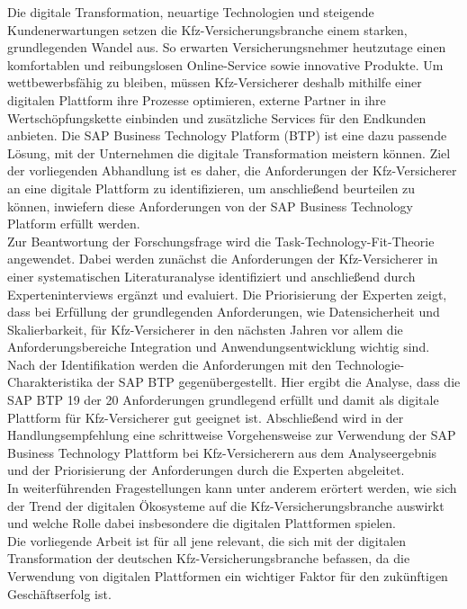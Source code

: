 Die digitale Transformation, neuartige Technologien und steigende Kundenerwartungen setzen die Kfz-Versicherungsbranche einem starken, grundlegenden Wandel aus. So erwarten Versicherungsnehmer heutzutage einen komfortablen und reibungslosen Online-Service sowie innovative Produkte. Um wettbewerbsfähig zu bleiben, müssen Kfz-Versicherer deshalb mithilfe einer digitalen Plattform ihre Prozesse optimieren, externe Partner in ihre Wertschöpfungskette einbinden und zusätzliche Services für den Endkunden anbieten. Die SAP Business Technology Platform (BTP) ist eine dazu passende Lösung, mit der Unternehmen die digitale Transformation meistern können. Ziel der vorliegenden Abhandlung ist es daher, die Anforderungen der Kfz-Versicherer an eine digitale Plattform zu identifizieren, um anschließend beurteilen zu können, inwiefern diese Anforderungen von der SAP Business Technology Platform erfüllt werden.\\
Zur Beantwortung der Forschungsfrage wird die Task-Technology-Fit-Theorie angewendet. Dabei werden zunächst die Anforderungen der Kfz-Versicherer in einer systematischen Literaturanalyse identifiziert und anschließend durch Experteninterviews ergänzt und evaluiert. Die Priorisierung der Experten zeigt, dass bei Erfüllung der grundlegenden Anforderungen, wie Datensicherheit und Skalierbarkeit, für Kfz-Versicherer in den nächsten Jahren vor allem die Anforderungsbereiche Integration und Anwendungsentwicklung wichtig sind. Nach der Identifikation werden die Anforderungen mit den Technologie-Charakteristika der SAP BTP gegenübergestellt. Hier ergibt die Analyse, dass die SAP BTP 19 der 20 Anforderungen grundlegend erfüllt und damit als digitale Plattform für Kfz-Versicherer gut geeignet ist. Abschließend wird in der Handlungsempfehlung eine schrittweise Vorgehensweise zur Verwendung der SAP Business Technology Plattform bei Kfz-Versicherern aus dem Analyseergebnis und der Priorisierung der Anforderungen durch die Experten abgeleitet. \\
In weiterführenden Fragestellungen kann unter anderem erörtert werden, wie sich der Trend der digitalen Ökosysteme auf die Kfz-Versicherungsbranche auswirkt und welche Rolle dabei insbesondere die digitalen Plattformen spielen.\\
Die vorliegende Arbeit ist für all jene relevant, die sich mit der digitalen Transformation der deutschen Kfz-Versicherungsbranche befassen, da die Verwendung von digitalen Plattformen ein wichtiger Faktor für den zukünftigen Geschäftserfolg ist.



